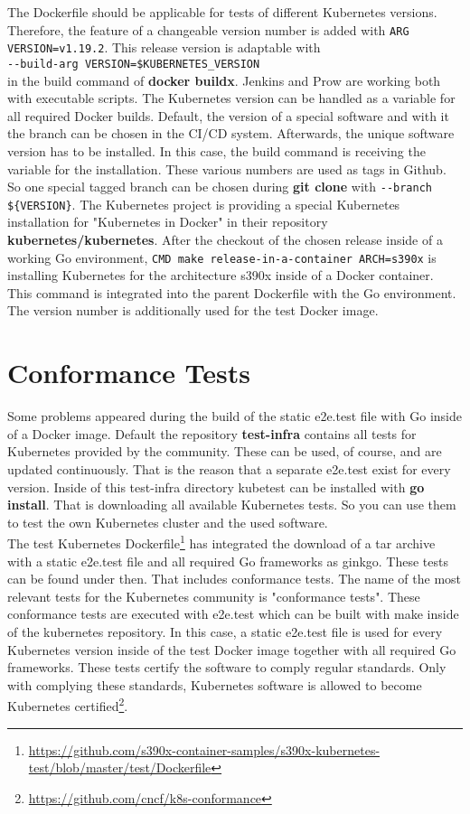 The Dockerfile should be applicable for tests of different Kubernetes versions. Therefore, the feature of a changeable version number is added with \lstinline!ARG VERSION=v1.19.2!. This release version is adaptable with \\
\verb+--build-arg VERSION=$KUBERNETES_VERSION+ \\
in the build command of \textbf{docker buildx}.
Jenkins and Prow are working both with executable scripts. The Kubernetes version can be handled as a variable for all required Docker builds.
Default, the version of a special software and with it the branch can be chosen in the \gls{CI/CD} system. Afterwards, the unique software version has to be installed. In this case, the build command is receiving the variable for the installation. These various numbers are used as tags in Github. So one special tagged branch can be chosen during \textbf{git clone} with \verb+--branch ${VERSION}+.
The Kubernetes project is providing a special Kubernetes installation for "Kubernetes in Docker" in their repository \textbf{kubernetes/kubernetes}.
After the checkout of the chosen release inside of a working Go environment, \verb+CMD make release-in-a-container ARCH=s390x+ is installing Kubernetes for the architecture s390x inside of a Docker container. \\
This command is integrated into the parent Dockerfile with the Go environment. The version number is additionally used for the test Docker image.


\section{Conformance Tests}

Some problems appeared during the build of the static e2e.test file with Go inside of a Docker image. 
Default the repository \textbf{test-infra} contains all tests for Kubernetes provided by the community. 
These can be used, of course, and are updated continuously. That is the reason that a separate e2e.test exist for every version. Inside of this test-infra directory kubetest can be installed with \textbf{go install}. 
That is downloading all available Kubernetes tests. So you can use them to test the own Kubernetes cluster and the used software. \\

The test Kubernetes Dockerfile\footnote{\url{https://github.com/s390x-container-samples/s390x-kubernetes-test/blob/master/test/Dockerfile}} has integrated the download of a tar archive with a static e2e.test file and all required Go frameworks as ginkgo.
These tests can be found under  then. That includes conformance tests.
The name of the most relevant tests for the Kubernetes community is "conformance tests". These conformance tests are executed with e2e.test  which can be built with make inside of the kubernetes repository. 
In this case, a static e2e.test file is used for every Kubernetes version inside of the test Docker image together with all required Go frameworks. These tests certify the software to comply regular standards. Only with complying these standards, Kubernetes software is allowed to become Kubernetes certified\footnote{\url{https://github.com/cncf/k8s-conformance}}. 

